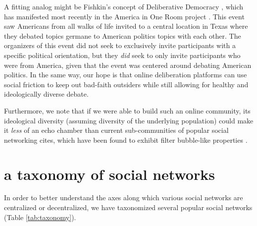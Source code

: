 \documentclass[sigconf,authordraft]{acmart}
\begin{document}
A fitting analog might be Fishkin's concept of Deliberative Democracy \cite{fishkin1991democracy}, which has manifested most recently in the America in One Room project \cite{AmericaInOneRoom}. This event saw Americans from all walks of life invited to a central location in Texas where they debated topics germane to American politics topics with each other. The organizers of this event did not seek to exclusively invite participants with a specific political orientation, but they {\itshape did} seek to only invite participants who were from America, given that the event was centered around debating American politics. In the same way, our hope is that online deliberation platforms can use social friction to keep out bad-faith outsiders while still allowing for healthy and ideologically diverse debate.

Furthermore, we note that if we were able to build such an online community, its ideological diversity (assuming diversity of the underlying population) could make it {\itshape less} of an echo chamber than current sub-communities of popular social networking cites, which have been found to exhibit filter bubble-like properties \cite{pariser2011filter}.



\section{a taxonomy of social networks}

In order to better understand the axes along which various social networks are centralized or decentralized, we have taxonomized several popular social networks  (Table \ref{tab:taxonomy}).

\end{document}

